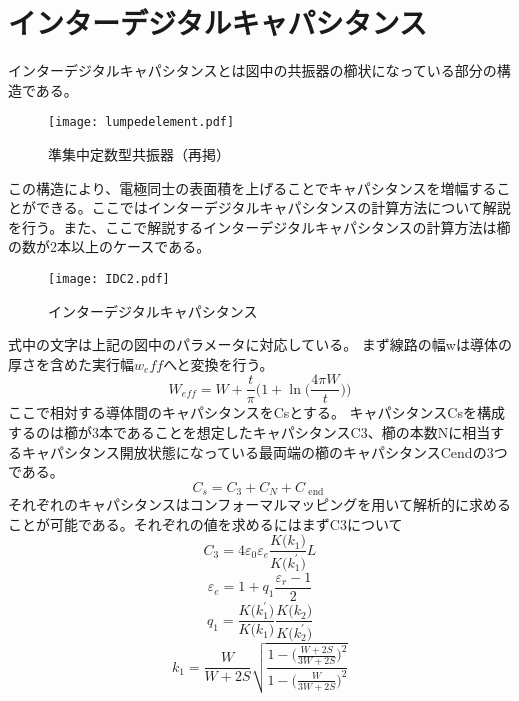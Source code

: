 \section{インターデジタルキャパシタンス}
インターデジタルキャパシタンスとは図中の共振器の櫛状になっている部分の構造である。
\begin{figure}[H]
    \label{le}
    \centering
    \texttt{[image: lumpedelement.pdf]}
    \caption{準集中定数型共振器（再掲）}
\end{figure}
この構造により、電極同士の表面積を上げることでキャパシタンスを増幅することができる。ここではインターデジタルキャパシタンスの計算方法について解説を行う。また、ここで解説するインターデジタルキャパシタンスの計算方法は櫛の数が2本以上のケースである。\cite*{Gevorgian1996,Dib2005,Dib2001ComprehensiveSO}
\begin{figure}[H]
    \centering
    \texttt{[image: IDC2.pdf]}
    \caption{インターデジタルキャパシタンス}
\end{figure}
式中の文字は上記の図中のパラメータに対応している。
まず線路の幅wは導体の厚さを含めた実行幅$w_eff$へと変換を行う。\cite*{Gevorgian1996}
\begin{equation}
    W_{e f f}=W+\frac{t}{\pi}\biggl(1+\ln \biggl(\frac{4 \pi W}{t}\biggr)\biggr)
\end{equation}
ここで相対する導体間のキャパシタンスをCsとする。
キャパシタンスCsを構成するのは櫛が3本であることを想定したキャパシタンスC3、櫛の本数Nに相当するキャパシタンス開放状態になっている最両端の櫛のキャパシタンスCendの3つである。
\begin{equation}
    C_{s}=C_{3}+C_{N}+C_{\text { end }}
\end{equation}
それぞれのキャパシタンスはコンフォーマルマッピングを用いて解析的に求めることが可能である。それぞれの値を求めるにはまずC3について
\begin{equation}
    C_{3}=4 \varepsilon_{0} \varepsilon_{e} \frac{K\biggl(k_{1}\biggr)}{K\biggl(k_{1}^{\prime}\biggr)} L
\end{equation}\begin{equation}
    \varepsilon_{e}=1+q_{1} \frac{\varepsilon_{r}-1}{2}
\end{equation}
\begin{equation}
        q_{1}=\frac{K\biggl(k_{1}^{\prime}\biggr)}{K\biggl(k_{1}\biggr)} \frac{K\biggl(k_{2}\biggr)}{K\biggl(k_{2}^{\prime}\biggr)}
\end{equation}
\begin{equation}
    k_{1}=\frac{W}{W+2 S} \sqrt{\frac{1-\biggl(\frac{W+2 S}{3 W+2 S}\biggr)^{2}}{1-\biggl(\frac{W}{3 W+2 S}\biggr)^{2}}}
\end{equation}
